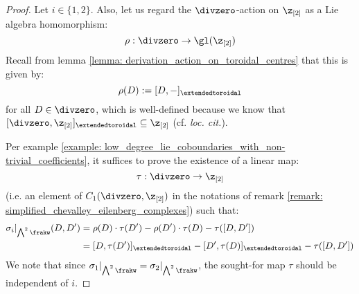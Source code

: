             \begin{proof}
                Let $i \in \{1, 2\}$. Also, let us regard the $\divzero$-action on $\z_{[2]}$ as a Lie algebra homomorphism:
                    $$\rho: \divzero \to \gl( \z_{[2]} )$$
                Recall from lemma \ref{lemma: derivation_action_on_toroidal_centres} that this is given by:
                    $$\rho(D) := [D, -]_{\extendedtoroidal}$$
                for all $D \in \divzero$, which is well-defined because we know that $[\divzero, \z_{[2]}]_{\extendedtoroidal} \subseteq \z_{[2]}$ (cf. \textit{loc. cit.}).
            
                Per example \ref{example: low_degree_lie_coboundaries_with_non-trivial_coefficients}, it suffices to prove the existence of a linear map:
                    $$\tau: \divzero \to \z_{[2]}$$
                (i.e. an element of $C_1(\divzero, \z_{[2]})$ in the notations of remark \ref{remark: simplified_chevalley_eilenberg_complexes}) such that:
                    $$
                        \begin{aligned}
                            \sigma_i|_{\bigwedge^2 \frakw}(D, D') & = \rho(D) \cdot \tau(D') - \rho(D') \cdot \tau(D) - \tau([D, D'])
                            \\
                            & = [D, \tau(D')]_{\extendedtoroidal} - [D', \tau(D)]_{\extendedtoroidal} - \tau([D, D'])
                        \end{aligned}
                    $$
                We note that since $\sigma_1|_{\bigwedge^2 \frakw} = \sigma_2|_{\bigwedge^2 \frakw}$, the sought-for map $\tau$ should be independent of $i$. 
                    

\end{proof}
